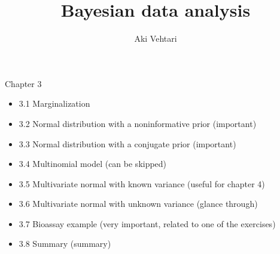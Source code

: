 \documentclass[finnish,english,t]{beamer}
\title[]{Bayesian data analysis}
\subtitle{}
\author{Aki Vehtari}
\institute[Aalto]{}
\begin{document}
\begin{frame}{Chapter 3}

  \begin{itemize}
\item 3.1 Marginalization
\item 3.2 Normal distribution with a noninformative prior (important)
\item 3.3 Normal distribution with a conjugate prior (important)
\item 3.4 Multinomial model (can be skipped)
\item 3.5 Multivariate normal with known variance (useful for chapter 4)
\item 3.6 Multivariate normal with unknown variance (glance through)
\item 3.7 Bioassay example (very important, related to one of the exercises)
\item 3.8 Summary (summary)
  \end{itemize}
\end{frame}
\end{document}
